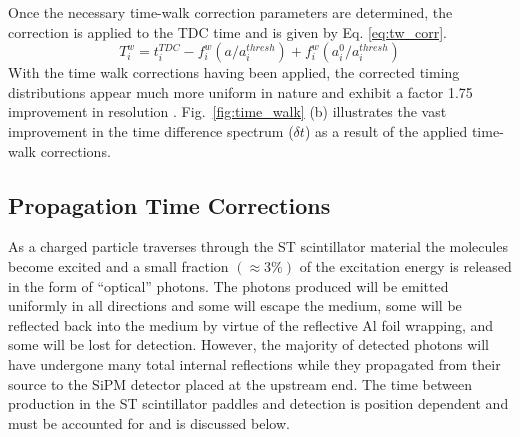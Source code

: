 Once the necessary time-walk correction parameters are determined, the correction is applied to the TDC time and is given by Eq. \ref{eq:tw_corr}.
	\begin{equation} \label{eq:tw_corr}
		T^{w}_{i} = t^{TDC}_{i} - f^{w}_{i}(a/a^{thresh}_{i}) + f^{w}_{i}(a^{0}_{i}/a^{thresh}_{i})
	\end{equation}
With the time walk corrections having been applied, the corrected timing distributions appear much more uniform in nature and exhibit a factor 1.75 improvement in resolution \cite{pooser16}.  Fig.~\ref{fig:time_walk} (b) illustrates the vast improvement in the time difference spectrum ($\delta t$) as a result of the applied time-walk corrections.

\subsection{Propagation Time Corrections} \label{sec:calib_ptc}

As a charged particle traverses through the ST scintillator material the molecules become excited and a small fraction $(\approx 3\%)$ \cite{pdg_2012} of the excitation energy is released in the form of ``optical'' photons.  The photons produced will be emitted uniformly in all directions and some will escape the medium, some will be reflected back into the medium by virtue of the reflective Al foil wrapping, and some will be lost for detection.  However, the majority of detected  photons will have undergone many total internal reflections while they propagated from their source to the SiPM detector placed at the upstream end.  The time between production in the ST scintillator paddles and detection is position dependent and must be accounted for and is discussed below.

